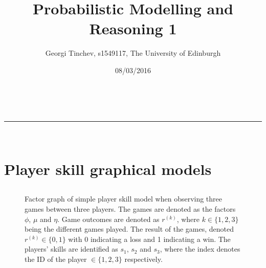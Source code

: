 \documentclass[a4paper,11pt]{article}
\makeatletter
\newcommand{\linia}{\rule{\linewidth}{0.5pt}}
\theoremstyle{mytheor}
\renewcommand{\maketitle}{
\begin{center}
\vspace{2ex}
{\huge \textsc{\@title}}
\vspace{1ex}
\\
\linia\\
\@author \hfill \@date
\vspace{4ex}
\end{center}
}
\makeatother
\begin{document}
\title{Probabilistic Modelling and Reasoning \textnumero{} 1}

\author{Georgi Tinchev, s1549117, The University of Edinburgh}

\date{08/03/2016}

\maketitle

\section{Player skill graphical models}


\subsection{}

\begin{figure}[htpb!]
    \centering
    \caption{Factor graph of simple player skill model when observing three games between three players. The games are denoted as the factors $\phi$, $\mu$ and $\eta$. Game outcomes are denoted as $r^{(k)}$, where $k\in{\{1,2,3\}}$ being the different games played. The result of the games, denoted $r^{(k)}\in{\{0,1\}}$ with 0 indicating a loss and 1 indicating a win. The players' skills are identified as $s_1$, $s_2$ and $s_3$, where the index denotes the ID of the player $\in{\{1,2,3\}}$ respectively.}
    \label{fig:fg}
\end{figure}
      
\subsection{}
\end{document}

